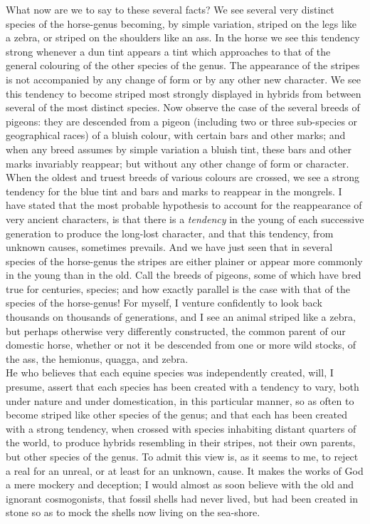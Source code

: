 \indent What now are we to say to these several facts? We see several very distinct species of the horse-genus becoming, by simple variation, striped on the legs like a zebra, or striped on the shoulders like an ass. In the horse we see this tendency strong whenever a dun tint appears a tint which approaches to that of the general colouring of the other species of the genus. The appearance of the stripes is not accompanied by any change of form or by any other new character. We see this tendency to become striped most strongly displayed in hybrids from between several of the most distinct species. Now observe the case of the several breeds of pigeons: they are descended from a pigeon (including two or three sub-species or geographical races) of a bluish colour, with certain bars and other marks; and when any breed assumes by simple variation a bluish tint, these bars and other marks invariably reappear; but without any other change of form or character. When the oldest and truest breeds of various colours are crossed, we see a strong tendency for the blue tint and bars and marks to reappear in the mongrels. I have stated that the most probable hypothesis to account for the reappearance of very ancient characters, is that there is a \emph{tendency} in the young of each successive generation to produce the long-lost character, and that this tendency, from unknown causes, sometimes prevails. And we have just seen that in several species of the horse-genus the stripes are either plainer or appear more commonly in the young than in the old. Call the breeds of pigeons, some of which have bred true for centuries, species; and how exactly parallel is the case with that of the species of the horse-genus! For myself, I venture confidently to look back thousands on thousands of generations, and I see an animal striped like a zebra, but perhaps otherwise very differently constructed, the common parent of our domestic horse, whether or not it be descended from one or more wild stocks, of the ass, the hemionus, quagga, and zebra.\\
\indent He who believes that each equine species was independently created, will, I presume, assert that each species has been created with a tendency to vary, both under nature and under domestication, in this particular manner, so as often to become striped like other species of the genus; and that each has been created with a strong tendency, when crossed with species inhabiting distant quarters of the world, to produce hybrids resembling in their stripes, not their own parents, but other species of the genus. To admit this view is, as it seems to me, to reject a real for an unreal, or at least for an unknown, cause. It makes the works of God a mere mockery and deception; I would almost as soon believe with the old and ignorant cosmogonists, that fossil shells had never lived, but had been created in stone so as to mock the shells now living on the sea-shore.\\

